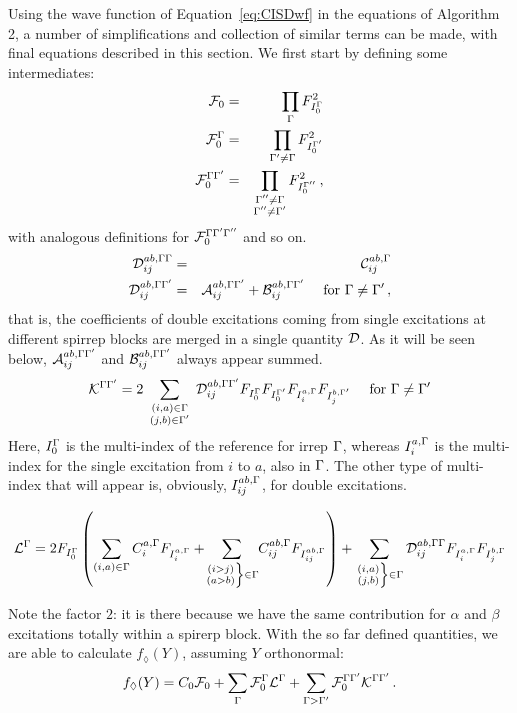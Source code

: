 Using the wave function of Equation~\eqref{eq:CISDwf} in the equations of Algorithm 2, a number of simplifications and collection of similar terms can be made, with final equations described in this section.
We first start by defining some intermediates:
\begin{eqnarray}
  \mathcal{F}_0 &=& \prod_{\Gamma} F_{I_0^{\Gamma}}^2\\
  \mathcal{F}_0^{\Gamma} &=& \prod_{{\Gamma'} \ne \Gamma} F_{I_0^{\Gamma'}}^2\\
  \mathcal{F}_0^{\Gamma{\ensuremath{\Gamma'}}} &=&
    \prod_{\substack{{{\Gamma''} \ne \Gamma}\\{{\Gamma''} \ne {\ensuremath{\Gamma'}}}}} F_{I_0^{{\Gamma''}}}^2\,,
\end{eqnarray}
with analogous definitions for $\mathcal{F}_0^{\Gamma{\ensuremath{\Gamma'}}{\ensuremath{\Gamma''}}}$ and so on.
\begin{eqnarray}
  \mathcal{D}_{ij}^{ab, \Gamma\Gamma} &=& \mathcal{C}_{ij}^{ab, \Gamma}\\
  \mathcal{D}_{ij}^{ab, \Gamma{\ensuremath{\Gamma'}}} &=& \mathcal{A}_{ij}^{ab, \Gamma{\ensuremath{\Gamma'}}} + \mathcal{B}_{ij}^{ab, \Gamma{\ensuremath{\Gamma'}}}
                            \quad\text{ for }\Gamma \ne {\ensuremath{\Gamma'}}\,,
\end{eqnarray}
that is, the coefficients of double excitations coming from single excitations at different spirrep blocks are merged in a single quantity $\mathcal{D}$.
As it will be seen below, $\mathcal{A}_{ij}^{ab, \Gamma{\ensuremath{\Gamma'}}}$ and $\mathcal{B}_{ij}^{ab, \Gamma{\ensuremath{\Gamma'}}}$ always appear summed.
\begin{equation}
  \label{eq:K_for_CISD}
  \mathcal{K}^{\irp\irpP} = 2 \sumijabmix \Dmix_{ij}^{ab, \irp\irpP}
  F_{I_0^\irp} F_{I_0^\irpP} F_{I_i^{a,\irp}} F_{I_j^{b,\irpP}}
  \quad\text{ for }\irp \ne \irpP
\end{equation}
Here, ${I_0^{\Gamma}}$ is the multi-index of the reference for irrep $\Gamma$, whereas ${I_i^{a,\Gamma}}$ is the multi-index for the single excitation from $i$ to $a$, also in $\Gamma$.
The other type of multi-index that will appear is, obviously, ${I_{ij}^{ab,\Gamma}}$, for double excitations.

\begin{equation}
  \label{eq:L_for_CISD}
  \mathcal{L}^\irp = 2 F_{I_0^\irp}
  \left(
    \sum_{(i,a) \in \irp} C_{i}^{a, \irp} F_{I_i^{a,\irp}}
    + \sumijabrestr C_{ij}^{ab, \irp}  F_{I_{ij}^{ab,\irp}}
  \right)
  + \sumijabfull \Dmix_{ij}^{ab, \irp\irp}
  F_{I_i^{a,\irp}} F_{I_j^{b,\irp}}
\end{equation}

Note the factor $2$: it is there because we have the same contribution for $\alpha$ and $\beta$ excitations totally within a spirerp block.
With the so far defined quantities, we are able to calculate $f_\lozenge(Y)$, assuming $Y$ orthonormal:
\begin{equation}
  \label{eq:f_for_CISD}
  f_\lozenge(Y) = C_0 \mathcal{F}_0
  + \sum_{\Gamma} \mathcal{F}_0^{\Gamma}\mathcal{L}^{\Gamma}
  + \sum_{\Gamma > {\Gamma'}} \mathcal{F}_0^{\Gamma{\ensuremath{\Gamma'}}}\mathcal{K}^{\Gamma{\ensuremath{\Gamma'}}}\,.
\end{equation}

